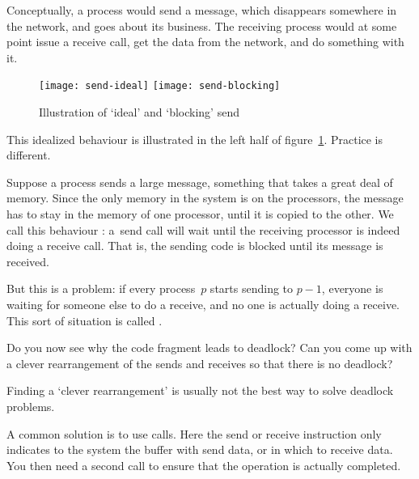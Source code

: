Conceptually, a process would send a message, which disappears
somewhere in the network, and goes about its business.
The receiving process would at some point issue a receive call,
get the data from the network, and do something with it.
\begin{figure}[t]
  \leavevmode
  \texttt{[image: send-ideal]}\hfill
  \texttt{[image: send-blocking]}
  \caption{Illustration of `ideal' and `blocking' send}
  \label{fig:cw-send-blocking}
\end{figure}
This idealized behaviour is illustrated in the left half of
figure~\ref{fig:cw-send-blocking}. Practice is different.

Suppose a process sends a large message, something that takes
a great deal of memory. Since the only memory in the system
is on the processors, the message has to stay in the memory 
of one processor, until it is copied to the other.
We call this behaviour :
a~send call will wait until the receiving processor is
indeed doing a receive call. That is, the sending code is blocked
until its message is received.

But this is a problem: if every process~$p$ starts sending to $p-1$,
everyone is waiting for someone else to do a receive, and no one is
actually doing a receive. This sort of situation is called
.

\begin{exercise}
  Do you now see why the code fragment
  leads to deadlock? Can you come up with a clever rearrangement of the sends 
  and receives so that there is no deadlock?
\end{exercise}

Finding a `clever rearrangement' is usually not the best way to 
solve deadlock problems.
\begin{comment}
  One solution is to use \indextermsub{one-sided}{communication}.
  Here the idea is that:
  \begin{itemize}
  \item Each processor declares an area, called a `window', that is accessible to other
    pprocessors; and
  \item Other processors can then put data in another processor's window, or take data
    from it.
  \end{itemize}
  One-sided communication sounds attractive, but it is often easier and more efficient
\end{comment}
A common solution is
to use  calls. Here the send or receive instruction
only indicates to the system the buffer with send data, or in which to receive data. 
You then need a second call to ensure that the operation is actually completed.


